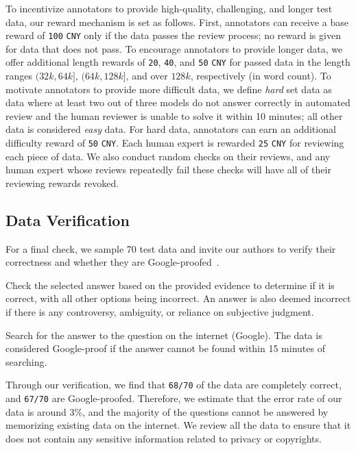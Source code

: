 To incentivize annotators to provide high-quality, challenging, and longer test data, our reward mechanism is set as follows. First, annotators can receive a base reward of \texttt{100} \texttt{CNY} only if the data passes the review process; no reward is given for data that does not pass. To encourage annotators to provide longer data, we offer additional length rewards of \texttt{20}, \texttt{40}, and \texttt{50} \texttt{CNY} for passed data in the length ranges $(32k, 64k]$, $(64k, 128k]$, and over $128k$, respectively (in word count). To motivate annotators to provide more difficult data, we define \emph{hard} set data as data where at least two out of three models do not answer correctly in automated review and the human reviewer is unable to solve it within 10 minutes; all other data is considered \emph{easy} data. For hard data, annotators can earn an additional difficulty reward of \texttt{50} \texttt{CNY}.
Each human expert is rewarded \texttt{25} \texttt{CNY} for reviewing each piece of data. We also conduct random checks on their reviews, and any human expert whose reviews repeatedly fail these checks will have all of their reviewing rewards revoked.

\subsection{Data Verification}
For a final check, we sample 70 test data and invite our authors to verify their correctness and whether they are Google-proofed~\cite{rein2023gpqa}.

Check the selected answer based on the provided evidence to determine if it is correct, with all other options being incorrect. An answer is also deemed incorrect if there is any controversy, ambiguity, or reliance on subjective judgment.

 Search for the answer to the question on the internet (Google). The data is considered Google-proof if the answer cannot be found within 15 minutes of searching.

Through our verification, we find that \texttt{68/70} of the data are completely correct, and \texttt{67/70} are Google-proofed. Therefore, we estimate that the error rate of our data is around 3\%, and the majority of the questions cannot be answered by memorizing existing data on the internet.
We review all the data to ensure that it does not contain any sensitive information related to privacy or copyrights.

